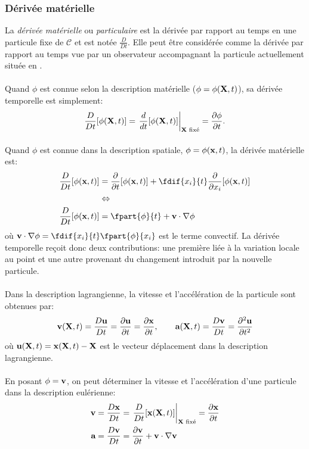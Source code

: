 \subsubsection*{Dérivée matérielle}
La \emph{dérivée matérielle} ou \emph{particulaire} est la dérivée par rapport au temps en une particule fixe de $\mathcal{C}$ et est notée $\frac{D}{Dt}$. Elle peut être considérée comme la dérivée par rapport au temps vue par un observateur accompagnant la particule actuellement située en .
\paragraph{}
 Quand $\phi$ est connue selon la description matérielle ($\phi=\phi(\textbf{X},t)$), sa dérivée temporelle est simplement: $$\frac{D}{Dt}[\phi(\textbf{X},t)]=\left.\frac{d}{dt}[\phi(\textbf{X},t)]\right|_{\textbf{X}\text{ fixé}}=\frac{\partial \phi}{\partial t}.$$

\paragraph{}
Quand $\phi$ est connue dans la description spatiale, $\phi=\phi(\textbf{x},t)$, la dérivée matérielle est:
$$\begin{aligned}
\frac{D}{Dt}[\phi(\fv{x},t)]&=\frac{\partial}{\partial t}[\phi(\fv{x},t)]+\fdif{x_i}{t}\frac{\partial}{\partial x_i}[\phi(\fv{x},t)]\\
 &\Leftrightarrow\\
 \frac{D}{Dt}[\phi(\fv{x},t)]&=\fpart{\phi}{t} + \fv{v}\cdot\nabla\phi
\end{aligned}$$
où $\fv{v}\cdot\nabla\phi=\fdif{x_i}{t}\fpart{\phi}{x_i}$ est le terme convectif. La dérivée temporelle reçoit donc deux contributions: une première liée à la variation locale au point  et une autre provenant du changement introduit par la nouvelle particule.
\paragraph{}
Dans la description lagrangienne, la vitesse et l'accélération de la particule sont obtenues par:
$$\textbf{v}(\textbf{X},t)=\frac{D\textbf{u}}{Dt}=\frac{\partial \textbf{u}}{\partial t}=\frac{\partial \textbf{x}}{\partial t},\qquad \textbf{a}(\textbf{X},t)=\frac{D\textbf{v}}{Dt}=\frac{\partial^2\textbf{u}}{\partial t^2}$$ où $\textbf{u}(\textbf{X},t)=\textbf{x}(\textbf{X},t)-\textbf{X}$ est le vecteur déplacement dans la description lagrangienne.
\paragraph{}
En posant $\phi=\textbf{v}$, on peut déterminer la vitesse et l'accélération d'une particule dans la description eulérienne:
$$\begin{aligned}
\textbf{v}&=\frac{D\textbf{x}}{Dt}=\left.\frac{D}{Dt}[\textbf{x}(\textbf{X},t)]\right|_{\textbf{X}\text{ fixé}}=\frac{\partial \textbf{x}}{\partial t}\\
\textbf{a}&=\frac{D\textbf{v}}{Dt}=\frac{\partial \textbf{v}}{\partial t}+\textbf{v}\cdot\nabla\textbf{v}
\end{aligned}$$
